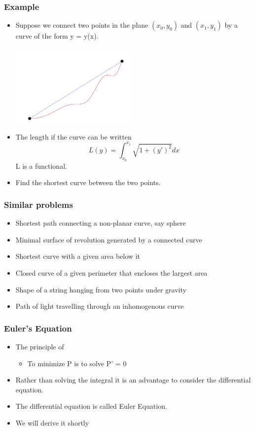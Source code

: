 \documentclass[10pt]{beamer}
\begin{document}
\begin{frame}
  \frametitle{Example}
  \begin{itemize}
  \item Suppose we connect two points in the plane $(x_0, y_0)$ and
    $(x_1, y_1)$ by a curve of the form y = y(x).
    \centerline{\includegraphics[height=4cm]{basic-curve}}
  \item The length if the curve can be written
    \[ L(y) = \int_{x_0}^{x_1} \sqrt{1 + (y')^2} dx \]
    L is a functional. 
  \item Find the shortest curve between the two points. 
  \end{itemize}
\end{frame}

\begin{frame}
  \frametitle{Similar problems}
  \begin{itemize}
  \item Shortest path connecting a non-planar curve, say sphere
  \item Minimal surface of revolution generated by a connected curve
  \item Shortest curve with a given area below it
  \item Closed curve of a given perimeter that encloses the largest area
  \item Shape of a string hanging from two points under gravity
  \item Path of light travelling through an inhomogenous curve
  \end{itemize}
\end{frame}


\begin{frame}
  \frametitle{Euler's Equation}
  \begin{itemize}
  \item The principle of 
    \begin{itemize}
    \item To minimize P is to solve P' = 0
    \end{itemize}
  \item Rather than solving the integral it is an advantage to
    consider the differential equation. 
  \item The differential equation is called Euler Equation. 
  \item We will derive it shortly
  \end{itemize}
\end{frame}
\end{document}

